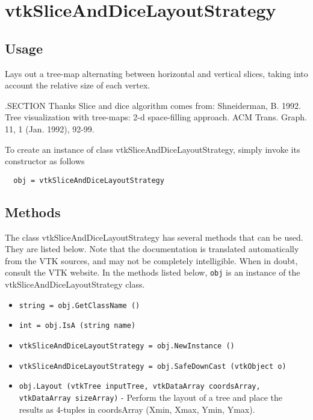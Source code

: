 \section{vtkSliceAndDiceLayoutStrategy}

\subsection{Usage}

 Lays out a tree-map alternating between horizontal and vertical slices,
 taking into account the relative size of each vertex.

 .SECTION Thanks
 Slice and dice algorithm comes from:
 Shneiderman, B. 1992. Tree visualization with tree-maps: 2-d space-filling approach. 
 ACM Trans. Graph. 11, 1 (Jan. 1992), 92-99. 

To create an instance of class vtkSliceAndDiceLayoutStrategy, simply
invoke its constructor as follows
\begin{verbatim}
  obj = vtkSliceAndDiceLayoutStrategy
\end{verbatim}
\subsection{Methods}

The class vtkSliceAndDiceLayoutStrategy has several methods that can be used.
  They are listed below.
Note that the documentation is translated automatically from the VTK sources,
and may not be completely intelligible.  When in doubt, consult the VTK website.
In the methods listed below, \verb|obj| is an instance of the vtkSliceAndDiceLayoutStrategy class.
\begin{itemize}
\item  \verb|string = obj.GetClassName ()|

\item  \verb|int = obj.IsA (string name)|

\item  \verb|vtkSliceAndDiceLayoutStrategy = obj.NewInstance ()|

\item  \verb|vtkSliceAndDiceLayoutStrategy = obj.SafeDownCast (vtkObject o)|

\item  \verb|obj.Layout (vtkTree inputTree, vtkDataArray coordsArray, vtkDataArray sizeArray)| -  Perform the layout of a tree and place the results as 4-tuples in
 coordsArray (Xmin, Xmax, Ymin, Ymax).

\end{itemize}
